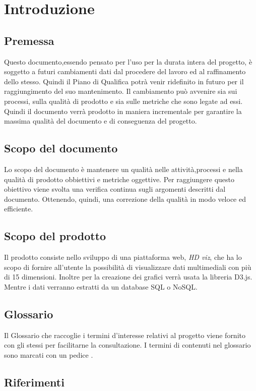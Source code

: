 \section{Introduzione}

    \subsection{Premessa}
    Questo documento,essendo pensato per l'uso per la durata intera del progetto, è soggetto a futuri cambiamenti dati dal procedere del lavoro ed al raffinamento dello stesso. Quindi il Piano di Qualifica potrà venir ridefinito in futuro per il raggiungimento del suo mantenimento. Il cambiamento può avvenire sia sui processi, sulla qualità di prodotto e sia sulle metriche che sono legate ad essi. Quindi il documento verrà prodotto in maniera incrementale per garantire la massima qualità del documento e di conseguenza del progetto.
    
    \subsection{Scopo del documento}
    Lo scopo del documento è mantenere un qualità nelle attività,processi e nella qualità di prodotto obbiettivi e metriche oggettive. Per raggiungere questo obiettivo viene svolta una verifica continua sugli argomenti descritti dal documento. Ottenendo, quindi, una correzione della qualità in modo veloce ed efficiente.
    
    \subsection{Scopo del prodotto}
    Il prodotto consiste nello sviluppo di una piattaforma web, \textit{HD viz}, che ha lo scopo di fornire all'utente la possibilità di visualizzare dati multimediali con più di 15 dimensioni. Inoltre per la creazione dei grafici verrà usata la libreria D3.js. Mentre i dati verranno estratti da un database SQL o NoSQL.
    
    \subsection{Glossario}
    Il Glossario che raccoglie i termini d'interesse relativi al progetto viene fornito con gli stessi per facilitarne la consultazione. I termini di contenuti nel glossario sono marcati con un pedice \glo{}.

    \subsection{Riferimenti}
